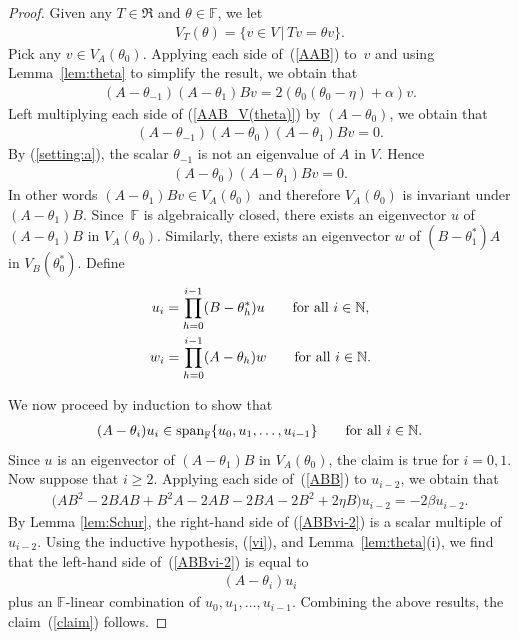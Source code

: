 \documentclass[pdftex]{sigma}
\def\N{\mathbb N}
\def\F{\mathbb F}
\numberwithin{equation}{section}
\begin{document}
\begin{proof}
Given any $T\in \Re$ and $\theta\in \F$, we let
\begin{gather*}
V_T(\theta)=\{v\in V\,|\, Tv=\theta v\}.
\end{gather*}
Pick any $v\in V_A(\theta_0)$. Applying each side of~(\ref{AAB}) to~$v$ and using Lemma~\ref{lem:theta} to simplify the result, we obtain that
\begin{gather}\label{AAB_V(theta)}
(A-\theta_{-1})(A-\theta_1) B v=2(\theta_0(\theta_0-\eta)+\alpha)v.
\end{gather}
Left multiplying each side of (\ref{AAB_V(theta)}) by $(A-\theta_0)$, we obtain that
\begin{gather*}
(A-\theta_{-1})(A-\theta_0)(A-\theta_1) B v=0.
\end{gather*}
By (\ref{setting:a}), the scalar $\theta_{-1}$ is not an eigenvalue of $A$ in $V$. Hence
\begin{gather*}
(A-\theta_0)(A-\theta_1) B v=0.
\end{gather*}
In other words $(A-\theta_1) B v\in V_A(\theta_0)$ and therefore $V_A(\theta_0)$ is invariant under $(A-\theta_1) B$. Since~$\F$ is algebraically closed, there exists an eigenvector $u$ of $(A-\theta_1) B$ in $V_A(\theta_0)$. Similarly, there exists an eigenvector $w$ of $(B-\theta_1^*)A$ in $V_B(\theta_0^*)$. Define
\begin{gather}
u_i=\prod_{h=0}^{i-1} (B-\theta_h^*) u \qquad \hbox{for all $i\in \N$},\label{vi}\\
w_i=\prod_{h=0}^{i-1} (A-\theta_h) w\qquad \hbox{for all $i\in \N$}. \label{wi}
\end{gather}

We now proceed by induction to show that
\begin{gather}\label{claim}
(A-\theta_i)u_i\in \operatorname{span}_\F\{u_0,u_1,\ldots,u_{i-1}\} \qquad \hbox{for all $i\in \N$}.
\end{gather}
Since $u$ is an eigenvector of $(A-\theta_1) B$ in $V_A(\theta_0)$, the claim is true for $i=0,1$.
Now suppose that $i\geq 2$. Applying each side of~(\ref{ABB}) to $u_{i-2}$, we obtain that
\begin{gather}\label{ABBvi-2}
\big(A B^2 -2 BAB +B^2 A - 2 A B-2 BA-2 B^2+2 \eta B\big) u_{i-2}=-2 \beta u_{i-2}.
\end{gather}
By Lemma \ref{lem:Schur}, the right-hand side of (\ref{ABBvi-2}) is a scalar multiple of~$u_{i-2}$. Using the inductive hypothesis, (\ref{vi}), and Lemma~\ref{lem:theta}(i), we find that the left-hand side of~(\ref{ABBvi-2}) is equal to
\begin{gather}\label{ABBvi-2:LH'}
(A-\theta_i) u_i
\end{gather}
plus an $\F$-linear combination of $u_0,u_1,\ldots,u_{i-1}$. Combining the above results, the claim~(\ref{claim}) follows.


\end{proof}
\end{document}
